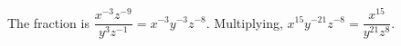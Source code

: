 The fraction is $\dfrac{x^{-3}z^{-9}}{y^3z^{-1}}=x^{-3}y^{-3}z^{-8}$. Multiplying, $x^{15}y^{-21}z^{-8}=\boxed{\dfrac{x^{15}}{y^{21}z^8}}$.
